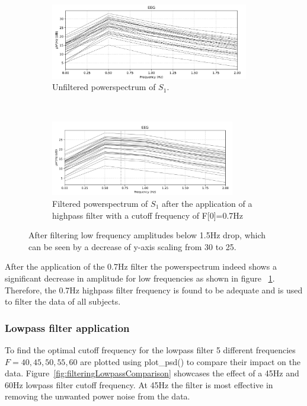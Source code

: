 \documentclass[a4paper]{article}
\begin{document}
\begin{figure}[tbh!] 
\centering
 \begin{subfigure}[t]{0.5\textwidth}
        \centering
        \includegraphics[height=1.3in]{highpassBefore.png}
\caption{Unfiltered powerspectrum of $S_1$.}
\end{subfigure}%
    ~ 
\begin{subfigure}[t]{0.5\textwidth}
        \centering
        \includegraphics[height=1.3in]{highpassAfter.png}
        \caption{Filtered powerspectrum of $S_1$ after the application of a highpass filter with a cutoff frequency of F[0]=0.7Hz}
\end{subfigure}
    \caption{After filtering low frequency amplitudes below 1.5Hz drop, which can be seen by a decrease of y-axis scaling from 30 to 25.}
    \label{fig:filteringHighpassComparisonApplied}
\end{figure}

After the application of the 0.7Hz filter the powerspectrum indeed shows a significant decrease in amplitude for low frequencies as shown in figure ~\ref{fig:filteringHighpassComparisonApplied}.
Therefore, the 0.7Hz highpass filter frequency is found to be adequate and is used to filter the data of all subjects.


\subsubsection{Lowpass filter application}
To find the optimal cutoff frequency for the lowpass filter 5 different frequencies $F={40, 45, 50, 55, 60}$ are plotted using plot\_psd() to compare their impact on the data.
Figure~\ref{fig:filteringLowpassComparison} showcases the effect of a 45Hz and 60Hz lowpass filter cutoff frequency.
At 45Hz the filter is most effective in removing the unwanted power noise from the data.
\end{document}
